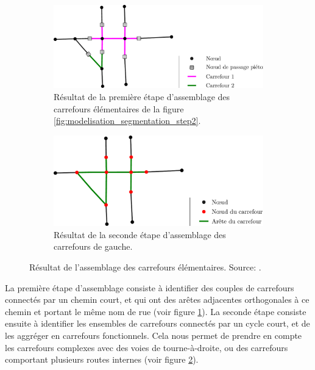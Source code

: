 \begin{figure}[ht]
    \centering
    \begin{subfigure}[t]{.49\linewidth}
        \includegraphics[width=\textwidth]{images/modelisation/segmentation/segmentation-step3.pdf}
        \caption{Résultat de la première étape d'assemblage des carrefours élémentaires de la figure \ref{fig:modelisation_segmentation_step2}.\label{fig:modelisation_segmentation_step3}}
    \end{subfigure}
    \begin{subfigure}[t]{.49\linewidth}
        \includegraphics[width=\textwidth]{images/modelisation/segmentation/segmentation-step4.pdf}
        \caption{Résultat de la seconde étape d'assemblage des carrefours de gauche.\label{fig:modelisation_segmentation_step4}}
    \end{subfigure}
    \caption[Assemblage de carrefours élémentaires]{Résultat de l'assemblage des carrefours élémentaires. Source: \citep{Favreau2022}.}
    \label{fig:modelisation_segmentation_step3&4}
\end{figure}

\newpar{}

La première étape d'assemblage consiste à identifier des couples de carrefours connectés par un chemin court, et qui ont des arêtes adjacentes orthogonales à ce chemin et portant le même nom de rue (voir figure \ref{fig:modelisation_segmentation_step3}). La seconde étape consiste ensuite à identifier les ensembles de carrefours connectés par un cycle court, et de les aggréger en carrefours fonctionnels. Cela nous permet de prendre en compte les carrefours complexes avec des voies de tourne-à-droite, ou des carrefours comportant plusieurs routes internes (voir figure \ref{fig:modelisation_segmentation_step4}). 

